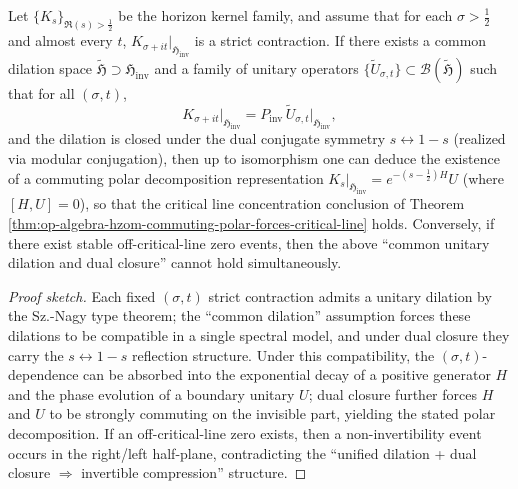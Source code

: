 \begin{proposition}\label{prop:op-algebra-common-unitary-dilation-criterion}
Let \(\{K_s\}_{\Re(s)>\tfrac12}\) be the horizon kernel family, and assume that for each \(\sigma>\tfrac12\) and almost every \(t\),
\(
K_{\sigma+it}\big|_{\mathfrak{H}_{\mathrm{inv}}}
\)
is a strict contraction.
If there exists a common dilation space \(\widetilde{\mathfrak H}\supset\mathfrak{H}_{\mathrm{inv}}\) and a family of unitary operators \(\{\widetilde U_{\sigma,t}\}\subset\mathcal{B}(\widetilde{\mathfrak H})\) such that for all \((\sigma,t)\),
\[
K_{\sigma+it}\big|_{\mathfrak{H}_{\mathrm{inv}}}
=P_{\mathrm{inv}}\,\widetilde U_{\sigma,t}\big|_{\mathfrak{H}_{\mathrm{inv}}},
\]
and the dilation is closed under the dual conjugate symmetry \(s\leftrightarrow 1-s\) (realized via modular conjugation),
then up to isomorphism one can deduce the existence of a commuting polar decomposition representation
\(
K_s\big|_{\mathfrak{H}_{\mathrm{inv}}}=e^{-(s-\tfrac12)H}U
\)
(where \([H,U]=0\)), so that the critical line concentration conclusion of Theorem \ref{thm:op-algebra-hzom-commuting-polar-forces-critical-line} holds.
Conversely, if there exist stable off-critical-line zero events, then the above ``common unitary dilation and dual closure'' cannot hold simultaneously.
\end{proposition}
\begin{proof}[Proof sketch]
Each fixed \((\sigma,t)\) strict contraction admits a unitary dilation by the Sz.-Nagy type theorem;
the ``common dilation'' assumption forces these dilations to be compatible in a single spectral model, and under dual closure they carry the \(s\leftrightarrow 1-s\) reflection structure.
Under this compatibility, the \((\sigma,t)\)-dependence can be absorbed into the exponential decay of a positive generator \(H\) and the phase evolution of a boundary unitary \(U\);
dual closure further forces \(H\) and \(U\) to be strongly commuting on the invisible part, yielding the stated polar decomposition.
If an off-critical-line zero exists, then a non-invertibility event occurs in the right/left half-plane, contradicting the ``unified dilation + dual closure \(\Rightarrow\) invertible compression'' structure. \qedhere
\end{proof}


